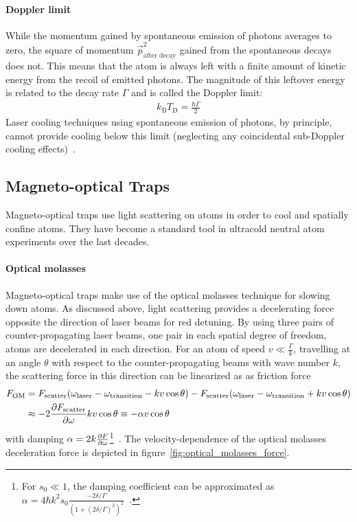 \paragraph*{Doppler limit} While the momentum gained by spontaneous emission of photons averages to zero, the square of momentum $\vec p_\text{after decay}^2$ gained from the spontaneous decays does not. This means that the atom is always left with a finite amount of kinetic energy from the recoil of emitted photons. The magnitude of this leftover energy is related to the decay rate $\Gamma$ and is called the Doppler limit:
\begin{align}
    k_\text{B} T_\text{D} = \frac{\hbar \Gamma}{2}
\end{align}
Laser cooling techniques using spontaneous emission of photons, by principle, cannot provide cooling below this limit (neglecting any coincidental sub-Doppler cooling effects)~\cite{foot_atomic_2005}.


\subsection*{Magneto-optical Traps}
Magneto-optical traps use light scattering on atoms in order to cool and spatially confine atoms. They have become a standard tool in ultracold neutral atom experiments over the last decades.

\paragraph{Optical molasses} Magneto-optical traps make use of the optical molasses technique for slowing down atoms. As discussed above, light scattering provides a decelerating force opposite the direction of laser beams for red detuning. By using three pairs of counter-propagating laser beams, one pair in each spatial degree of freedom, atoms are decelerated in each direction. For an atom of speed $v \ll \frac{\Gamma}{k}$, travelling at an angle $\theta$ with respect to the  counter-propagating beams with wave number $k$, the scattering force in this direction can be linearized as as friction force
\begin{equation}
    \begin{split}
        F_\text{OM} &= F_\text{scatter}(\omega_\text{laser} - \omega_\text{transition} - kv \cos \theta) - F_\text{scatter}(\omega_\text{laser} - \omega_\text{transition} + kv \cos \theta) \\
        &\approx - 2 \pdv{F_\text{scatter}}{\omega} k v \cos \theta \equiv -\alpha v \cos \theta
    \end{split}
\end{equation}
with damping $\alpha = 2k \pdv{F}{\omega}$\footnote{For $s_0 \ll 1$, the damping coefficient can be approximated as $\alpha  = 4 \hbar k^2 s_0 \frac{-2\delta/\Gamma}{{\left(1+{{(2\delta/\Gamma)}}^2\right)}^2}$~\cite{foot_atomic_2005}.}~\cite{foot_atomic_2005}. The velocity-dependence of the optical molasses deceleration force is depicted in figure~\ref{fig:optical_molasses_force}.

